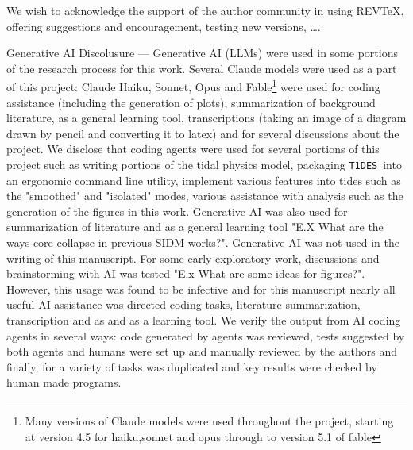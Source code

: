 \documentclass[%
 reprint,
 amsmath,
 amssymb,
 aps,
]{revtex4-2}
\def\tides{{\tt T1DES}~}
\begin{document}
\begin{acknowledgments}
We wish to acknowledge the support of the author community in using
REV\TeX{}, offering suggestions and encouragement, testing new versions,
\dots.

Generative AI Discolusure --- Generative AI (LLMs) were used in some portions of the research process for this work.
Several Claude models were used as a part of this project: Claude Haiku, Sonnet, Opus and Fable\footnote{Many versions of Claude models were used throughout the project, starting at version 4.5 for haiku,sonnet and opus through to version 5.1 of fable} were used for coding assistance (including the generation of plots), summarization of background literature, as a general learning tool, transcriptions (taking an image of a diagram drawn by pencil and converting it to latex) and for several discussions about the project.
We disclose that coding agents were used for several portions of this project such as writing portions of the tidal physics model, packaging \tides into an ergonomic command line utility, implement various features into tides such as the "smoothed" and "isolated" modes, various assistance with analysis such as the generation of the figures in this work. 
Generative AI was also used for summarization of literature and as a general learning tool "E.X What are the ways core collapse in previous SIDM works?".
Generative AI was not used in the writing of this manuscript. 
For some early exploratory work, discussions and brainstorming with AI was tested "E.x What are some ideas for figures?". 
However, this usage was found to be infective and for this manuscript nearly all useful AI assistance was directed coding tasks, literature summarization, transcription and as and as a learning tool.
We verify the output from AI coding agents in several ways: code generated by agents was reviewed, tests suggested by both agents and humans were set up and manually reviewed by the authors and finally, for a variety of tasks was duplicated and key results were checked by human made programs. 


\end{acknowledgments}

\appendix
\end{document}
